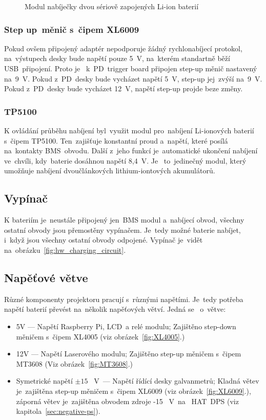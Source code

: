 \begin{figure}[htb]
\begin{minipage}{0.3\textwidth}
    \caption{\label{fig:TP5100} Modul nabíječky dvou sériově zapojených Li-ion baterií~\cite{laskakit-TP5100}}
  \end{minipage}
\end{figure}

\subsubsection{Step up~měnič s~čipem XL6009}
Pokud ovšem připojený adaptér nepodporuje žádný rychlonabíjecí protokol, na~výstupech desky bude napětí pouze 5~V, na~kterém standartně běží USB~připojení. Proto je ~k~PD~trigger board připojen step-up měnič nastavený na~9~V.
Pokud z~PD~desky bude vycházet napětí 5~V, step-up jej~zvýší na~9~V. Pokud z~PD~desky bude vycházet 12~V, napětí step-up projde beze změny.

\subsubsection{TP5100}
K ovládání průběhu nabíjení byl~využit modul pro~nabíjení Li-ionových baterií s~čipem TP5100. Ten~zajišťuje konstantní proud a~napětí, které posílá na~kontakty BMS~obvodu. Další z~jeho funkcí je~automatické ukončení nabíjení ve~chvíli, kdy~baterie dosáhnou napětí 8,4~V. Je ~to~jedinečný modul, který umožňuje nabíjení dvoučlánkových lithium-iontových akumulátorů.

\subsection{Vypínač}
K bateriím je~neustále připojený jen~BMS modul a~nabíjecí obvod, všechny ostatní obvody jsou přemostěny vypínačem. Je~tedy možné baterie nabíjet, i~když jsou všechny ostatní obvody odpojené. Vypínač je~vidět na~obrázku~\ref{fig:hw_charging_circuit}.

\subsection{Napěťové větve}
Různé komponenty projektoru pracují s~různými napětími. Je~tedy potřeba napětí baterií převést na~několik napěťových větví. Jedná se ~o~větve:

\begin{itemize}
  \item 5V --- Napětí Raspberry Pi, LCD~a relé modulu; Zajištěno step-down měničem s~čipem XL4005 (viz obrázek~\ref{fig:XL4005}.)
  \item 12V --- Napětí Laserového modulu; Zajištěno step-up měničem s~čipem MT3608 (Viz obrázek~\ref{fig:MT3608}.)
  \item Symetrické napětí $\pm{}15$ ~V~--- Napětí řídící desky galvanmetrů; Kladná větev je~zajištěna step-up měničem s~čipem XL6009 (viz obrázek~\ref{fig:XL6009}.), záporná větev je~zajištěna obvodem zdroje -15 ~V~na ~HAT~DPS (viz kapitola~\ref{sec:negative-ps}).
\end{itemize}



